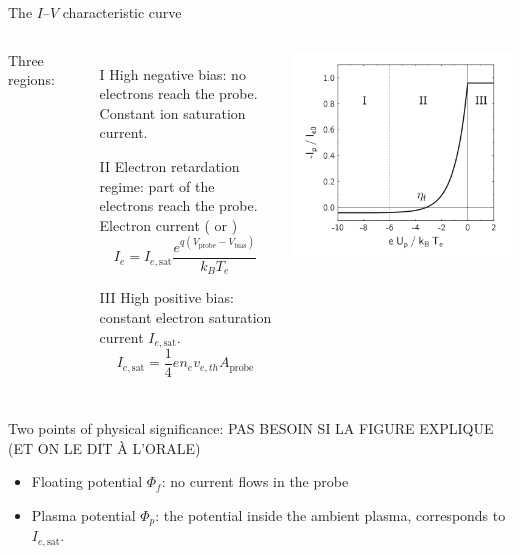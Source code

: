 \documentclass[10pt]{beamer}
\newcommand{\electronsaturationcurrent}[0]{\ensuremath{I_{e,{\mathrm{sat}}}}}
\newcommand{\biasvoltage}{\ensuremath{V_{\mathrm{bias}}}}
\newcommand{\probevoltage}{\ensuremath{V_{\mathrm{probe}}}}
\begin{document}
\begin{frame}{The $I$--$V$ characteristic curve}
    \begin{columns}
        Three regions:
        \begin{enumerate}
            \item[I] High negative bias: no electrons reach the probe. Constant ion saturation current.
            \item[II] Electron retardation regime: part of the electrons reach the probe. Electron current ( or )
            \begin{equation*}
                I_e = \electronsaturationcurrent \frac{e^{q(\probevoltage - \biasvoltage)}}{k_B T_e}
            \end{equation*}
            \item[III] High positive bias: constant electron saturation current $\electronsaturationcurrent$.
            \begin{equation*}
                \electronsaturationcurrent = \frac{1}{4}e n_e v_{e,th} A_{\mathrm{probe}}
            \end{equation*}
        \end{enumerate}
        \includegraphics[width=\textwidth]{../figures/langmuir_characteristic_PLACEHOLDER.png}
    \end{columns}
    Two points of physical significance: PAS BESOIN SI LA FIGURE EXPLIQUE (ET ON LE DIT À L'ORALE)
    \begin{itemize}
        \item Floating potential $\Phi_f$: no current flows in the probe
        \item Plasma potential $\Phi_p$: the potential inside the ambient plasma, corresponds to $\electronsaturationcurrent$.
            
    \end{itemize}
\end{frame}
\end{document}
